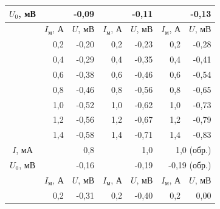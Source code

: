 \begin{longtable}[c]{l|rr|rr|rr|}
		\multicolumn{1}{|c|}{$U_0$, мВ} & \multicolumn{2}{r|}{-0,09}                    & \multicolumn{2}{r|}{-0,11}                    & \multicolumn{2}{r|}{-0,13}                    \\ \hline
		& \multicolumn{1}{c|}{$I_\text{м}$, А} & $U$, мВ & \multicolumn{1}{c|}{$I_\text{м}$, А} & $U$, мВ & \multicolumn{1}{c|}{$I_\text{м}$, А} & $U$, мВ \\ \cline{2-7} 
		& \multicolumn{1}{r|}{0,2}            & -0,20  & \multicolumn{1}{r|}{0,2}            & -0,23  & \multicolumn{1}{r|}{0,2}            & -0,28  \\ \cline{2-7} 
		& \multicolumn{1}{r|}{0,4}            & -0,29  & \multicolumn{1}{r|}{0,4}            & -0,35  & \multicolumn{1}{r|}{0,4}            & -0,41  \\ \cline{2-7} 
		& \multicolumn{1}{r|}{0,6}            & -0,38  & \multicolumn{1}{r|}{0,6}            & -0,46  & \multicolumn{1}{r|}{0,6}            & -0,54  \\ \cline{2-7} 
		& \multicolumn{1}{r|}{0,8}            & -0,46  & \multicolumn{1}{r|}{0,8}            & -0,56  & \multicolumn{1}{r|}{0,8}            & -0,65  \\ \cline{2-7} 
		& \multicolumn{1}{r|}{1,0}            & -0,52  & \multicolumn{1}{r|}{1,0}            & -0,62  & \multicolumn{1}{r|}{1,0}            & -0,73  \\ \cline{2-7} 
		& \multicolumn{1}{r|}{1,2}            & -0,56  & \multicolumn{1}{r|}{1,2}            & -0,67  & \multicolumn{1}{r|}{1,2}            & -0,79  \\ \cline{2-7} 
		& \multicolumn{1}{r|}{1,4}            & -0,58  & \multicolumn{1}{r|}{1,4}            & -0,71  & \multicolumn{1}{r|}{1,4}            & -0,83  \\ \hline
		\multicolumn{1}{|c|}{$I$, мА}   & \multicolumn{2}{r|}{0,8}                      & \multicolumn{2}{r|}{1,0}                      & \multicolumn{2}{r|}{1,0 (обр.)}                      \\ \hline
		\multicolumn{1}{|c|}{$U_0$, мВ} & \multicolumn{2}{r|}{-0,16}                    & \multicolumn{2}{r|}{-0,19}                    & \multicolumn{2}{r|}{-0,19 (обр.)}                    \\ \hline
		& \multicolumn{1}{c|}{$I_\text{м}$, А} & $U$, мВ & \multicolumn{1}{c|}{$I_\text{м}$, А} & $U$, мВ & \multicolumn{1}{c|}{$I_\text{м}$, А} & $U$, мВ \\ \cline{2-7} 
		& \multicolumn{1}{r|}{0,2}            & -0,31  & \multicolumn{1}{r|}{0,2}            & -0,40  & \multicolumn{1}{r|}{0,2}            & 0,00   \\ \cline{2-7} 

\end{longtable}

